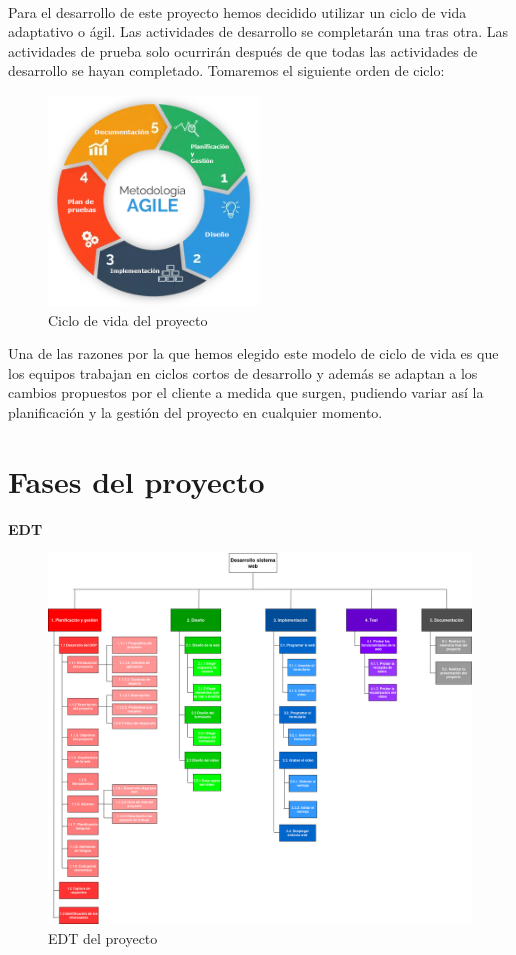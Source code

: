 \documentclass{report}
\begin{document}
            \paragraph*{}
            Para el desarrollo de este proyecto hemos decidido utilizar un ciclo de vida adaptativo o ágil. Las actividades de desarrollo se completarán una tras otra. Las actividades de prueba solo ocurrirán después de que todas las actividades de desarrollo se hayan completado.  Tomaremos el siguiente orden de ciclo:
            \begin{figure}[H]
                \centering
                \includegraphics[width=0.5\textwidth]{./img/ciclo_vida.png}
                \caption{Ciclo de vida del proyecto}
            \end{figure}
            Una de las razones por la que hemos elegido este modelo de ciclo de vida es que los equipos trabajan en ciclos cortos de desarrollo y además se adaptan a los cambios propuestos por el cliente a medida que surgen, pudiendo variar así la planificación y la gestión del proyecto en cualquier momento.
        \clearpage
        \section{Fases del proyecto}
            \textbf{EDT}
            \begin{figure}[H]
                \centering
                \includegraphics[width=1\textwidth]{./img/edt.png}
                \caption{EDT del proyecto}
            \end{figure}
            \clearpage
\end{document}
